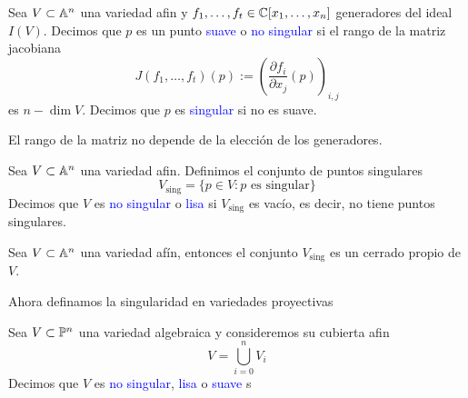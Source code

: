 \begin{definition}
    Sea $V\subset\mathbb{A}^n$ una variedad afin y $f_1,\dots,f_t\in\mathbb{C}[x_1,\dots,x_n]$ generadores del ideal $I(V)$. Decimos que $p$ es un punto \textcolor{blue}{suave} o \textcolor{blue}{no singular} si el rango de la matriz jacobiana
    \begin{equation*}
        J(f_1,\dots,f_t)(p):=\left(\frac{\partial f_i}{\partial x_j} (p)\right)_{i,j}
    \end{equation*}
    es $n-\dim V$. Decimos que $p$ es \textcolor{blue}{singular} si no es suave.
\end{definition}

\begin{remark}
    El rango de la matriz no depende de la elección de los generadores.
\end{remark}


\begin{definition}
    Sea $V\subset\mathbb{A}^n$ una variedad afin. Definimos el conjunto de puntos singulares
    \begin{equation*}
        V_{\text{sing}}=\{p\in V:p\text{ es singular}\}
    \end{equation*}
    Decimos que $V$ es \textcolor{blue}{no singular} o \textcolor{blue}{lisa} si $V_{\text{sing}}$ es vacío, es decir, no tiene puntos singulares.
\end{definition}




\begin{theorem}[Harstones]
    Sea $V\subset\mathbb{A}^n$ una variedad afín, entonces el conjunto $V_{\text{sing}}$ es un cerrado propio de $V$.
\end{theorem}

Ahora definamos la singularidad en variedades proyectivas
\begin{definition}
    Sea $V\subset\mathbb{P}^n$ una variedad algebraica y consideremos su cubierta afin
    \begin{equation*}
        V=\bigcup_{i=0}^nV_i
    \end{equation*}
    Decimos que $V$ es \textcolor{blue}{no singular}, \textcolor{blue}{lisa} o \textcolor{blue}{suave} s 
\end{definition}